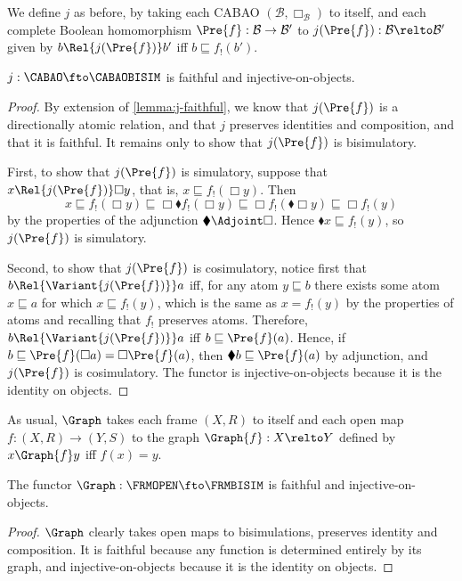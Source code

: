 We define \(j\) as before, by taking each CABAO
\((\mathcal{B}, \Box_{\mathcal{B}})\) to itself, and each complete
Boolean homomorphism \(\Pre{f} : \mathcal{B} \to \mathcal{B}'\) to
\(j(\Pre{f}) : \mathcal{B} \relto \mathcal{B}'\) given by
\(b \Rel{j(\Pre{f})} b'\) iff \(b \sqsubseteq f_!(b')\).

\begin{lemma}
  \(j : \CABAO \fto \CABAOBISIM\) is faithful and injective-on-objects.
\end{lemma}
\begin{proof}
  By extension of \cref{lemma:j-faithful}, we know that \(j(\Pre{f})\) is a
  directionally atomic relation, and that \(j\) preserves identities and
  composition, and that it is faithful. It remains only to show that
  \(j(\Pre{f})\) is bisimulatory.

  First, to show that \(j(\Pre{f})\) is simulatory, suppose that
  \(x \Rel{j(\Pre{f})} \Box y\), that is, \(x \sqsubseteq f_!(\Box y)\).
  Then
  \[
    x
    \sqsubseteq f_!(\Box y)
    \sqsubseteq \Box \blacklozenge f_!(\Box y)
    \sqsubseteq \Box f_!(\blacklozenge \Box y)
    \sqsubseteq \Box f_!(y)
  \]
  by the properties of the adjunction \(\blacklozenge \Adjoint \Box\). Hence
  \(\blacklozenge x \sqsubseteq f_!(y)\), so \(j(\Pre{f})\) is simulatory.

  Second, to show that \(j(\Pre{f})\) is cosimulatory, notice first that
  \(b \Rel{\Variant{j(\Pre{f})}} a\) iff, for any atom \(y \sqsubseteq b\) there
  exists some atom \(x \sqsubseteq a\) for which \(x \sqsubseteq f_!(y)\), which
  is the same as \(x = f_!(y)\) by the properties of atoms and recalling that
  \(f_!\) preserves atoms. Therefore, \(b \Rel{\Variant{j(\Pre{f})}} a\) iff
  \(b \sqsubseteq \Pre{f}(a)\). Hence, if
  \(b \sqsubseteq \Pre{f}(\Box a) = \Box \Pre{f}(a)\), then
  \(\blacklozenge b \sqsubseteq \Pre{f}(a)\) by adjunction, and \(j(\Pre{f})\) is
  cosimulatory. The functor is injective-on-objects because it is the identity
  on objects.
\end{proof}

As usual, \(\Graph\) takes each frame \((X, R)\) to itself and each open map
\(f : (X, R) \to (Y, S)\) to the graph \(\Graph{f} : X \relto Y\) defined by
\(x \Graph{f} y\) iff \(f(x) = y\).

\begin{lemma}
  The functor \(\Graph : \FRMOPEN \fto \FRMBISIM\) is faithful and
  injective-on-objects.
\end{lemma}
\begin{proof}
  \(\Graph\) clearly takes open maps to bisimulations, preserves identity and
  composition. It is faithful because any function is determined entirely by its
  graph, and injective-on-objects because it is the identity on objects.
\end{proof}

